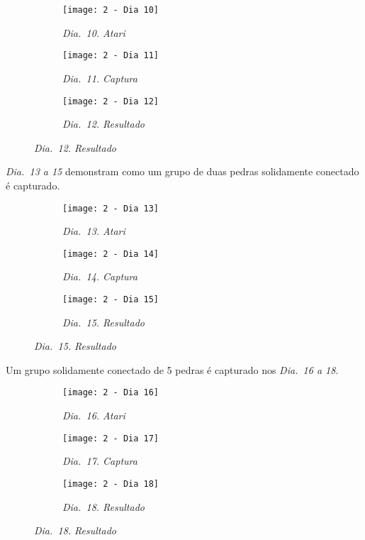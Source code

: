 \begin{figure}[h]
    \centering
    \begin{subfigure}{.3\textwidth}
        \centering
        \texttt{[image: 2 - Dia 10]}
        \caption*{\emph{Dia.\@~10. Atari}}
    \end{subfigure}
    \begin{subfigure}{.3\textwidth}
        \centering
        \texttt{[image: 2 - Dia 11]}
        \caption*{\emph{Dia.\@~11. Captura}}
    \end{subfigure}
    \begin{subfigure}{.3\textwidth}
        \centering
        \texttt{[image: 2 - Dia 12]}
        \caption*{\emph{Dia.\@~12. Resultado}}
    \end{subfigure}
\end{figure}

\emph{Dia.\@~13 a 15} demonstram  como um grupo de duas pedras solidamente conectado é capturado.

\begin{figure}[h]
    \centering
    \begin{subfigure}{.3\textwidth}
        \centering
        \texttt{[image: 2 - Dia 13]}
        \caption*{\emph{Dia.\@~13. Atari}}
    \end{subfigure}
    \begin{subfigure}{.3\textwidth}
        \centering
        \texttt{[image: 2 - Dia 14]}
        \caption*{\emph{Dia.\@~14. Captura}}
    \end{subfigure}
    \begin{subfigure}{.3\textwidth}
        \centering
        \texttt{[image: 2 - Dia 15]}
        \caption*{\emph{Dia.\@~15. Resultado}}
    \end{subfigure}
\end{figure}

Um grupo solidamente conectado de 5 pedras é capturado nos \emph{Dia.\@~16 a 18}.

\begin{figure}[h!]
    \centering
    \begin{subfigure}{.3\textwidth}
        \centering
        \texttt{[image: 2 - Dia 16]}
        \caption*{\emph{Dia.\@~16. Atari}}
    \end{subfigure}
    \begin{subfigure}{.3\textwidth}
        \centering
        \texttt{[image: 2 - Dia 17]}
        \caption*{\emph{Dia.\@~17. Captura}}
    \end{subfigure}
    \begin{subfigure}{.3\textwidth}
        \centering
        \texttt{[image: 2 - Dia 18]}
        \caption*{\emph{Dia.\@~18. Resultado}}
    \end{subfigure}
\end{figure}

